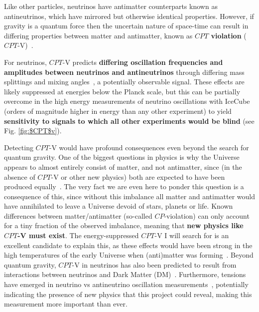 \documentclass[a4paper,11pt]{article}
\begin{document}
Like other particles, neutrinos have antimatter counterparts known as antineutrinos, which have mirrored but otherwise identical properties. However, if gravity is a quantum force then the uncertain nature of space-time  can result in differing properties between matter and antimatter, known as \textbf{$CPT$ violation} ($CPT$-V)~\cite{Mavromatos:2005mi, AmelinoCamelia:2008qg, RalfLehnert:2016grl}. 

For neutrinos, $CPT$-V predicts \textbf{differing oscillation frequencies and amplitudes between neutrinos and antineutrinos} through differing mass splittings and mixing angles~\cite{Barenboim:2017ewj}, a potentially observable signal. These effects are likely suppressed at energies below the Planck scale, but this can be partially overcome in the high energy measurements of neutrino oscillations with IceCube (orders of magnitude higher in energy than any other experiment) to yield \textbf{sensitivity to signals to which all other experiments would be blind} (see Fig. \ref{fig:$CPT$v}). 

Detecting $CPT$-V would have profound consequences even beyond the search for quantum gravity. One of the biggest questions in physics is why the Universe appears to almost entirely consist of matter, and not antimatter, since (in the absence of $CPT$-V or other new physics) both are expected to have been produced equally~\cite{Sakharov_1991}. The very fact we are even here to ponder this question is a consequence of this, since without this imbalance all matter and antimatter would have annihilated to leave a Universe devoid of stars, planets or life. Known differences between matter/antimatter (so-called $CP$-violation) can only account for a tiny fraction of the observed imbalance, meaning that \textbf{new physics like $CPT$-V must exist}. The energy-suppressed $CPT$-V I will search for is an excellent candidate to explain this, as these effects would have been strong in the high temperatures of the early Universe when (anti)matter was forming~\cite{Mavromatos:2017cxr, hep-ph/9809542}. Beyond quantum gravity, $CPT$-V in neutrinos has also been predicted to result from interactions between neutrinos and Dark Matter (DM)~\cite{Capozzi:2018bps, 1904.02518}. Furthermore, tensions have emerged in neutrino vs antineutrino oscillation measurements~\cite{Abe:2019vii,NOvA_CP_result}, potentially indicating the presence of new physics that this project could reveal, making this measurement more important than ever.

\end{document}
